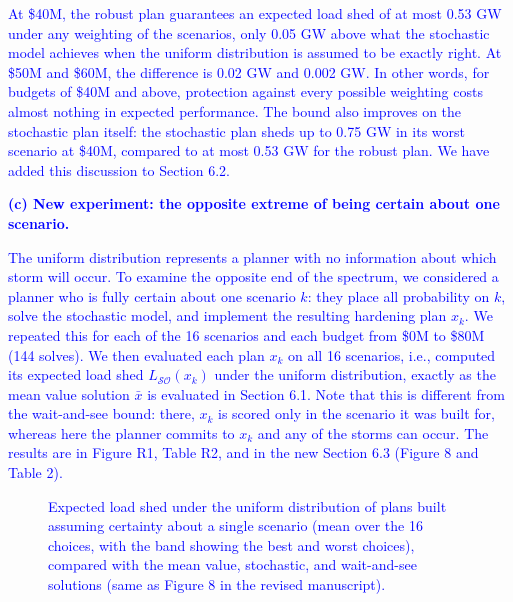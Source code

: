 \documentclass[authoryear,preprint,review,12pt]{elsarticle}\usepackage{amssymb}
\begin{document}
\textcolor{blue}{At \$40M, the robust plan guarantees an expected load shed of at most 0.53 GW under any weighting of the scenarios, only 0.05 GW above what the stochastic model achieves when the uniform distribution is assumed to be exactly right. At \$50M and \$60M, the difference is 0.02 GW and 0.002 GW. In other words, for budgets of \$40M and above, protection against every possible weighting costs almost nothing in expected performance. The bound also improves on the stochastic plan itself: the stochastic plan sheds up to 0.75 GW in its worst scenario at \$40M, compared to at most 0.53 GW for the robust plan. We have added this discussion to Section 6.2.}

\medskip
\textcolor{blue}{\textbf{(c) New experiment: the opposite extreme of being certain about one scenario.}}

\textcolor{blue}{The uniform distribution represents a planner with no information about which storm will occur. To examine the opposite end of the spectrum, we considered a planner who is fully certain about one scenario $k$: they place all probability on $k$, solve the stochastic model, and implement the resulting hardening plan $x_k$. We repeated this for each of the 16 scenarios and each budget from \$0M to \$80M (144 solves). We then evaluated each plan $x_k$ on all 16 scenarios, i.e., computed its expected load shed $L_{\mathcal{SO}}(x_k)$ under the uniform distribution, exactly as the mean value solution $\bar{x}$ is evaluated in Section 6.1. Note that this is different from the wait-and-see bound: there, $x_k$ is scored only in the scenario it was built for, whereas here the planner commits to $x_k$ and any of the storms can occur. The results are in Figure R1, Table R2, and in the new Section 6.3 (Figure 8 and Table 2).}

\begin{figure}[htbp]
\centering
\caption{\textcolor{blue}{Expected load shed under the uniform distribution of plans built assuming certainty about a single scenario (mean over the 16 choices, with the band showing the best and worst choices), compared with the mean value, stochastic, and wait-and-see solutions (same as Figure 8 in the revised manuscript).}}
\label{fig:r1}
\end{figure}
\end{document}
